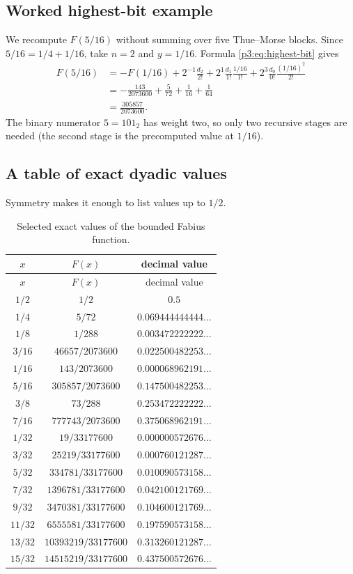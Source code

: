 \documentclass[11pt]{article}
\numberwithin{equation}{section}
\theoremstyle{definition}
\theoremstyle{remark}
\begin{document}
\subsection{Worked highest-bit example}

We recompute $F(5/16)$ without summing over five Thue--Morse blocks.  Since
$5/16=1/4+1/16$, take $n=2$ and $y=1/16$.  Formula \eqref{p3:eq:highest-bit} gives
\begin{align*}
 F(5/16)
 &=-F(1/16)
   +2^{-1}\frac{d_2}{2!}
   +2^{1}\frac{d_1}{1!}\frac{1/16}{1!}
   +2^{3}\frac{d_0}{0!}\frac{(1/16)^2}{2!}\\
 &=-\frac{143}{2073600}+\frac5{72}
   +\frac1{16}+\frac1{64}\\
 &=\frac{305857}{2073600}.
\end{align*}
The binary numerator $5=101_2$ has weight two, so only two recursive stages are needed (the second stage is the precomputed value at $1/16$).

\subsection{A table of exact dyadic values}

Symmetry makes it enough to list values up to $1/2$.
\begin{longtable}{c@{\qquad}c@{\qquad}c}
\caption{Selected exact values of the bounded Fabius function.}\label{p3:tab:dyadic-values}\\
\toprule
$x$ & $F(x)$ & decimal value\\
\midrule
\endfirsthead
\toprule
$x$ & $F(x)$ & decimal value\\
\midrule
\endhead
$1/2$&$1/2$&$0.5$\\
$1/4$&$5/72$&$0.069444444444\ldots$\\
$1/8$&$1/288$&$0.003472222222\ldots$\\
$3/16$&$46657/2073600$&$0.022500482253\ldots$\\
$1/16$&$143/2073600$&$0.000068962191\ldots$\\
$5/16$&$305857/2073600$&$0.147500482253\ldots$\\
$3/8$&$73/288$&$0.253472222222\ldots$\\
$7/16$&$777743/2073600$&$0.375068962191\ldots$\\
$1/32$&$19/33177600$&$0.000000572676\ldots$\\
$3/32$&$25219/33177600$&$0.000760121287\ldots$\\
$5/32$&$334781/33177600$&$0.010090573158\ldots$\\
$7/32$&$1396781/33177600$&$0.042100121769\ldots$\\
$9/32$&$3470381/33177600$&$0.104600121769\ldots$\\
$11/32$&$6555581/33177600$&$0.197590573158\ldots$\\
$13/32$&$10393219/33177600$&$0.313260121287\ldots$\\
$15/32$&$14515219/33177600$&$0.437500572676\ldots$\\
\bottomrule
\end{longtable}
\end{document}
